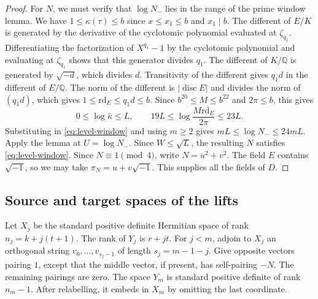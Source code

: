 \begin{proof}
For \(N\), we must verify that \(\log N_-\) lies in the range of the
prime window lemma. We have \(1\le\kappa(\tau)\le b\) since
\(x\le x_1\le b\) and \(x_1\mid b\).
The different of \(E/K\) is generated by the derivative of the
cyclotomic polynomial evaluated at \(\zeta_{q_1}\). Differentiating the
factorization of \(X^{q_1}-1\) by the cyclotomic polynomial and evaluating
at \(\zeta_{q_1}\) shows that this generator divides \(q_1\).
The different of \(K/\mathbb Q\) is generated by \(\sqrt{-d}\), which divides
\(d\). Transitivity of the different gives \(q_1d\) in the different of
\(E/\mathbb Q\). The norm of the different is \(|\operatorname{disc} E|\) and divides the norm
of \((q_1d)\), which gives \(1\le\mathrm{rd}_E\le q_1d\le b\).
Since \(b^{20}\le M\le b^{22}\) and \(2\pi\le b\), this gives
\[
 0\le\log\bar\kappa\le L,\qquad
 19L\le\log\frac{M\mathrm{rd}_E}{2\pi}\le23L .
\]
Substituting in \eqref{eq:level-window} and using \(m\ge2\) gives
\(mL\le\log N_-\le24mL\). Apply the lemma at \(U=\log N_-\).
Since \(W\le\sqrt L\), the resulting \(N\) satisfies \eqref{eq:level-window}.
Since \(N\equiv1\pmod4\), write \(N=u^2+v^2\). The field \(E\)
contains \(\sqrt{-1}\), so we may take \(\pi_N=u+v\sqrt{-1}\).
This supplies all the fields of \(D\).
\end{proof}

\subsection{Source and target spaces of the lifts}

Let \(X_j\) be the standard positive definite Hermitian space of rank
\(n_j=k+j(t+1)\). The rank of \(Y_j\) is \(r+jt\). For \(j<m\),
adjoin to \(X_j\) an orthogonal string \(v_0,\ldots,v_{s_j-1}\) of
length \(s_j=m-1-j\). Give opposite vectors pairing \(1\), except
that the middle vector, if present, has self-pairing \(-N\).
The remaining pairings are zero. The space \(Y_m\) is standard positive
definite of rank \(n_m-1\). After relabelling, it embeds in \(X_m\) by omitting the last coordinate.

